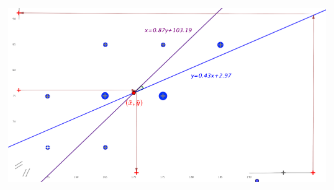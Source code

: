 \begin{example}
	\begin{figure}[H]
			\centering
			\includegraphics[width=0.75\textwidth]{imagenes/imagenes03/T03IM12.png}
	\end{figure}

\end{example}

\vspace{2cm} %

